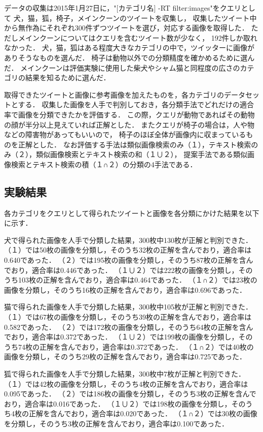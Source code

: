 データの収集は2015年1月27日に，"[カテゴリ名] -RT filter:images"をクエリとして
犬，猫，狐，椅子，メインクーンのツイートを収集し，
収集したツイート中から無作為にそれぞれ300件ずつツイートを選び，対応する画像を取得した．
ただしメインクーンについてはクエリを含むツイート数が少なく，
192件しか取れなかった．
犬，猫，狐はある程度大きなカテゴリの中で，ツイッターに画像がありそうなものを選んだ．
椅子は動物以外での分類精度を確かめるために選んだ．
メインクーンは評価実験に使用した柴犬やシャム猫と同程度の広さのカテゴリの結果を知るために選んだ．

取得できたツイートと画像に参考画像を加えたものを，各カテゴリのデータセットとする．
収集した画像を人手で判別しておき，各分類手法でどれだけの適合率で画像を分類できたかを評価する．
この際，クエリが動物であればその動物の顔が半分以上見えていれば正解とした．
またクエリが椅子の場合は，人や物などの障害物があってもいいので，
椅子のほぼ全体が画像内に収まっているものを正解とした．
なお評価する手法は類似画像検索のみ（１），テキスト検索のみ（２），類似画像検索とテキスト検索の和（１∪２），
提案手法である類似画像検索とテキスト検索の積（１∩２）の分類の4手法である．

\subsection{実験結果}

各カテゴリをクエリとして得られたツイートと画像を各分類にかけた結果を以下に示す．

犬で得られた画像を人手で分類した結果，300枚中130枚が正解と判別できた．
（１）では50枚の画像を分類し，そのうち32枚の正解を含んでおり，適合率は0.640であった．
（２）では195枚の画像を分類し，そのうち87枚の正解を含んでおり，適合率は0.446であった．
（１∪２）では222枚の画像を分類し，そのうち103枚の正解を含んでおり，適合率は0.464であった．
（１∩２）では23枚の画像を分類し，そのうち16枚の正解を含んでおり，適合率は0.696であった．

猫で得られた画像を人手で分類した結果，300枚中105枚が正解と判別できた．
（１）では67枚の画像を分類し，そのうち39枚の正解を含んでおり，適合率は0.582であった．
（２）では172枚の画像を分類し，そのうち64枚の正解を含んでおり，適合率は0.372であった．
（１∪２）では199枚の画像を分類し，そのうち74枚の正解を含んでおり，適合率は0.372であった．
（１∩２）では40枚の画像を分類し，そのうち29枚の正解を含んでおり，適合率は0.725であった．

狐で得られた画像を人手で分類した結果，300枚中7枚が正解と判別できた．
（１）では42枚の画像を分類し，そのうち4枚の正解を含んでおり，適合率は0.095であった．
（２）では186枚の画像を分類し，そのうち3枚の正解を含んでおり，適合率は0.016であった．
（１∪２）では198枚の画像を分類し，そのうち4枚の正解を含んでおり，適合率は0.020であった．
（１∩２）では30枚の画像を分類し，そのうち3枚の正解を含んでおり，適合率は0.100であった．

